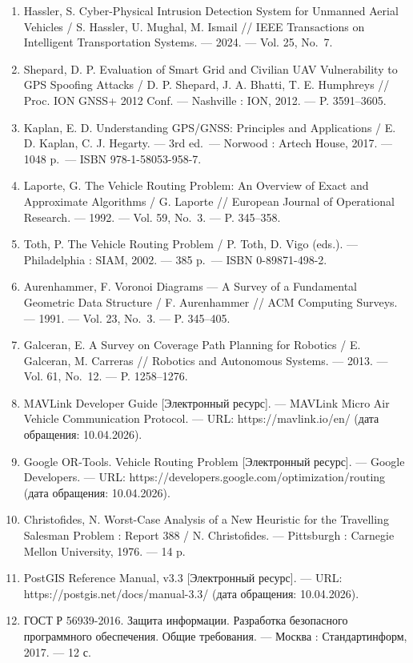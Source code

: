 \begin{enumerate}
\item
  Hassler, S. Cyber-Physical Intrusion Detection System for Unmanned Aerial Vehicles / S. Hassler, U. Mughal, M. Ismail // IEEE Transactions on Intelligent Transportation Systems. --- 2024. --- Vol. 25, No.~7.
\item
  Shepard, D. P. Evaluation of Smart Grid and Civilian UAV Vulnerability to GPS Spoofing Attacks / D. P. Shepard, J. A. Bhatti, T. E. Humphreys // Proc. ION GNSS+ 2012 Conf. --- Nashville : ION, 2012. --- P. 3591--3605.
\item
  Kaplan, E. D. Understanding GPS/GNSS: Principles and Applications / E. D. Kaplan, C. J. Hegarty. --- 3rd ed.~--- Norwood : Artech House, 2017. --- 1048 p.~--- ISBN 978-1-58053-958-7.
\item
  Laporte, G. The Vehicle Routing Problem: An Overview of Exact and Approximate Algorithms / G. Laporte // European Journal of Operational Research. --- 1992. --- Vol. 59, No.~3. --- P. 345--358.
\item
  Toth, P. The Vehicle Routing Problem / P. Toth, D. Vigo (eds.). --- Philadelphia : SIAM, 2002. --- 385 p.~--- ISBN 0-89871-498-2.
\item
  Aurenhammer, F. Voronoi Diagrams --- A Survey of a Fundamental Geometric Data Structure / F. Aurenhammer // ACM Computing Surveys. --- 1991. --- Vol. 23, No.~3. --- P. 345--405.
\item
  Galceran, E. A Survey on Coverage Path Planning for Robotics / E. Galceran, M. Carreras // Robotics and Autonomous Systems. --- 2013. --- Vol. 61, No.~12. --- P. 1258--1276.
\item
  MAVLink Developer Guide {[}Электронный ресурс{]}. --- MAVLink Micro Air Vehicle Communication Protocol. --- URL: https://mavlink.io/en/ (дата обращения: 10.04.2026).
\item
  Google OR-Tools. Vehicle Routing Problem {[}Электронный ресурс{]}. --- Google Developers. --- URL: https://developers.google.com/optimization/routing (дата обращения: 10.04.2026).
\item
  Christofides, N. Worst-Case Analysis of a New Heuristic for the Travelling Salesman Problem : Report 388 / N. Christofides. --- Pittsburgh : Carnegie Mellon University, 1976. --- 14 p.
\item
  PostGIS Reference Manual, v3.3 {[}Электронный ресурс{]}. --- URL: https://postgis.net/docs/manual-3.3/ (дата обращения: 10.04.2026).
\item
  ГОСТ Р 56939-2016. Защита информации. Разработка безопасного программного обеспечения. Общие требования. --- Москва : Стандартинформ, 2017. --- 12 с.

\end{enumerate}

